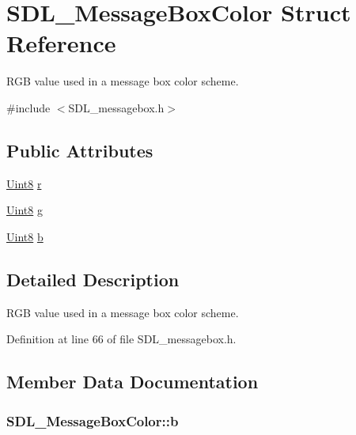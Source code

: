 \hypertarget{struct_s_d_l___message_box_color}{\section{S\-D\-L\-\_\-\-Message\-Box\-Color Struct Reference}
\label{struct_s_d_l___message_box_color}
}


R\-G\-B value used in a message box color scheme.  




{\ttfamily \#include $<$S\-D\-L\-\_\-messagebox.\-h$>$}

\subsection*{Public Attributes}
\begin{DoxyCompactItemize}
\item 
\hyperlink{_s_d_l__stdinc_8h_a2944638813a090aa23e62f4da842c3e2}{Uint8} \hyperlink{struct_s_d_l___message_box_color_a43ab2172c10058380fcf67ecc3f53184}{r}
\item 
\hyperlink{_s_d_l__stdinc_8h_a2944638813a090aa23e62f4da842c3e2}{Uint8} \hyperlink{struct_s_d_l___message_box_color_a5820adab0b32aa3eade101ea36ed6b4a}{g}
\item 
\hyperlink{_s_d_l__stdinc_8h_a2944638813a090aa23e62f4da842c3e2}{Uint8} \hyperlink{struct_s_d_l___message_box_color_ad1215a42167cb5b190ff8f19dbd42066}{b}
\end{DoxyCompactItemize}


\subsection{Detailed Description}
R\-G\-B value used in a message box color scheme. 

Definition at line 66 of file S\-D\-L\-\_\-messagebox.\-h.



\subsection{Member Data Documentation}
\hypertarget{struct_s_d_l___message_box_color_ad1215a42167cb5b190ff8f19dbd42066}{
\subsubsection[{b}]{ S\-D\-L\-\_\-\-Message\-Box\-Color\-::b}}\label{struct_s_d_l___message_box_color_ad1215a42167cb5b190ff8f19dbd42066}


